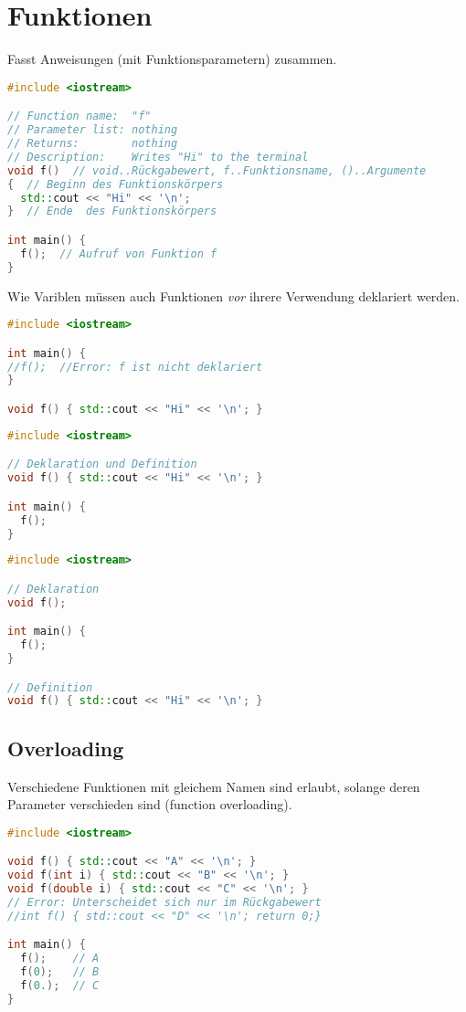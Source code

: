 \section{Funktionen}

Fasst Anweisungen (mit Funktionsparametern) zusammen.

\begin{lstlisting}[language=C++]
#include <iostream>

// Function name:  "f"
// Parameter list: nothing
// Returns:        nothing
// Description:    Writes "Hi" to the terminal
void f()  // void..Rückgabewert, f..Funktionsname, ()..Argumente
{  // Beginn des Funktionskörpers
  std::cout << "Hi" << '\n';
}  // Ende  des Funktionskörpers

int main() {
  f();  // Aufruf von Funktion f
}
\end{lstlisting}

Wie Variblen müssen auch Funktionen \emph{vor} ihrere Verwendung deklariert
werden.

\begin{lstlisting}[language=C++]
#include <iostream>

int main() {
//f();  //Error: f ist nicht deklariert
}

void f() { std::cout << "Hi" << '\n'; }
\end{lstlisting}

\begin{lstlisting}[language=C++]
#include <iostream>

// Deklaration und Definition
void f() { std::cout << "Hi" << '\n'; }

int main() {
  f();
}
\end{lstlisting}

\begin{lstlisting}[language=C++]
#include <iostream>

// Deklaration
void f();

int main() {
  f();
}

// Definition
void f() { std::cout << "Hi" << '\n'; }
\end{lstlisting}

\subsection{Overloading}

Verschiedene Funktionen mit gleichem Namen sind erlaubt, solange deren Parameter
verschieden sind (function overloading).

\begin{lstlisting}[language=C++]
#include <iostream>

void f() { std::cout << "A" << '\n'; }
void f(int i) { std::cout << "B" << '\n'; }
void f(double i) { std::cout << "C" << '\n'; }
// Error: Unterscheidet sich nur im Rückgabewert
//int f() { std::cout << "D" << '\n'; return 0;}

int main() {
  f();    // A
  f(0);   // B
  f(0.);  // C
}
\end{lstlisting}

